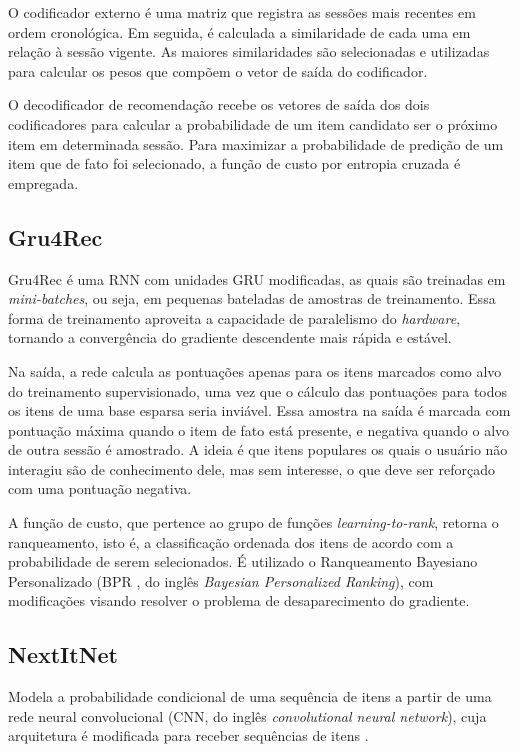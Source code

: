 O codificador externo é uma matriz que registra as sessões mais recentes em
ordem cronológica. Em seguida, é calculada a similaridade de cada uma em relação
à sessão vigente. As maiores similaridades são selecionadas e utilizadas para
calcular os pesos que compõem o vetor de saída do codificador.

O decodificador de recomendação recebe os vetores de saída dos dois
codificadores para calcular a probabilidade de um item candidato ser o próximo
item em determinada sessão. Para maximizar a probabilidade de predição de um
item que de fato foi selecionado, a função de custo por entropia cruzada é
empregada.

\subsection{Gru4Rec}
Gru4Rec  \cite{gru4rec_1} \cite{gru4rec_2} é uma RNN com unidades GRU
modificadas, as quais são treinadas em \textit{mini-batches}, ou seja, em
pequenas bateladas de amostras de treinamento. Essa forma de treinamento
aproveita a capacidade de paralelismo do \textit{hardware}, tornando a
convergência do gradiente descendente mais rápida e estável.

Na saída, a rede calcula as pontuações apenas para os itens marcados como
alvo do treinamento supervisionado, uma vez que o cálculo das
pontuações para todos os itens de uma base esparsa seria inviável. Essa amostra
na saída é marcada com pontuação máxima quando o item de fato está presente, e
negativa quando o alvo de outra sessão é amostrado. A ideia é que itens
populares os quais o usuário não interagiu são de conhecimento dele, mas sem
interesse, o que deve ser reforçado com uma pontuação negativa.

A função de custo, que pertence ao grupo de funções \textit{learning-to-rank},
retorna o ranqueamento, isto é, a classificação ordenada dos itens de acordo com
a probabilidade de serem selecionados. É utilizado o Ranqueamento Bayesiano
Personalizado (BPR \cite{rendle2009}, do inglês \textit{Bayesian Personalized
Ranking}), com modificações visando resolver o problema de desaparecimento do
gradiente. 

\subsection{NextItNet}
Modela a probabilidade condicional de uma sequência de itens a partir de uma
rede neural convolucional (CNN, do inglês \textit{convolutional neural
network}), cuja arquitetura é modificada para receber sequências de
itens \cite{nextitnet}.

